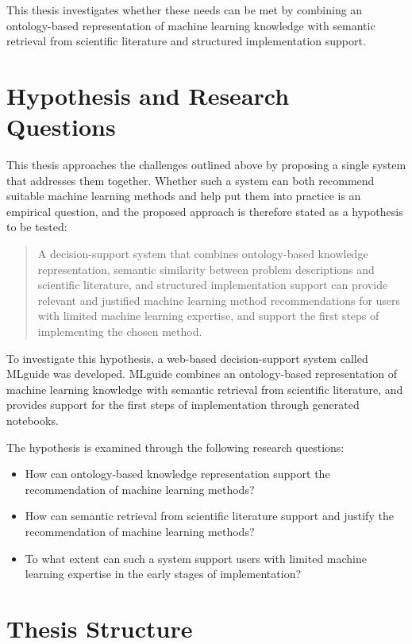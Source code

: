 This thesis investigates whether these needs can be met by 
combining an ontology-based representation of machine learning 
knowledge with semantic retrieval from scientific literature and 
structured implementation support.

\section{Hypothesis and Research Questions}
\label{sec:hypothesis-research-questions}

This thesis approaches the challenges outlined above by proposing a single
system that addresses them together. Whether such a system can
both recommend suitable machine learning methods and help put them into practice is an
empirical question, and the proposed approach is therefore stated
as a hypothesis to be tested: 

\begin{quote}
A decision-support system that combines ontology-based knowledge 
representation, semantic similarity between problem descriptions 
and scientific literature, and structured implementation support 
can provide relevant and justified machine learning method 
recommendations for users with limited machine learning expertise,
and support the first steps of implementing the chosen method.
\end{quote}

To investigate this hypothesis, a web-based decision-support
system called MLguide was developed. MLguide combines an
ontology-based representation of machine learning knowledge with
semantic retrieval from scientific literature, and provides
support for the first steps of implementation through generated notebooks. 

The hypothesis is examined through the following research questions:

\begin{itemize}
    \item How can ontology-based knowledge representation support 
    the recommendation of machine learning methods?
    \item How can semantic retrieval from scientific literature 
    support and justify the recommendation of machine learning methods?
    \item To what extent can such a system support users with 
    limited machine learning expertise in the early stages of 
    implementation?
\end{itemize}

\section{Thesis Structure}
\label{sec:thesis-structure}

